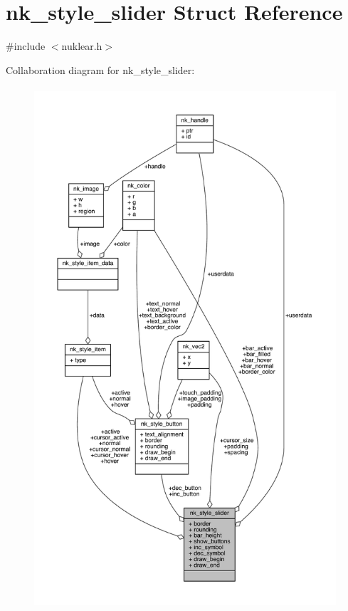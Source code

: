 \hypertarget{structnk__style__slider}{}\section{nk\+\_\+style\+\_\+slider Struct Reference}
\label{structnk__style__slider}


{\ttfamily \#include $<$nuklear.\+h$>$}



Collaboration diagram for nk\+\_\+style\+\_\+slider\+:
\nopagebreak
\begin{figure}[H]
\begin{center}
\leavevmode
\includegraphics[height=550pt]{structnk__style__slider__coll__graph}
\end{center}
\end{figure}
